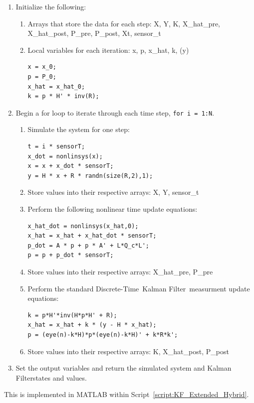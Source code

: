 \documentclass[]{article}
\renewcommand{\lstlistingname}{Script}
\newcommand{\scriptname}{\lstlistingname}
\newcommand{\KF}{Kalman Filter}
\newcommand{\DT}{Discrete-Time}
\newcommand{\DTKF}{\DT \ \KF}
\begin{document}
		\begin{enumerate}
			\item Initialize the following:
			\begin{enumerate}
				\item Arrays that store the data for each step: X, Y, K, X\_hat\_pre, X\_hat\_post, P\_pre, P\_post, Xt, sensor\_t\\
				\item Local variables for each iteration: x, p, x\_hat, k, (y)
\begin{lstlisting}
x = x_0;
p = P_0;
x_hat = x_hat_0;
k = p * H' * inv(R);
\end{lstlisting}
			\end{enumerate}
			\item Begin a for loop to iterate through each time step, \lstinline{for i = 1:N}.
			\begin{enumerate}
				\item Simulate the system for one step:
\begin{lstlisting}
t = i * sensorT;
x_dot = nonlinsys(x);
x = x + x_dot * sensorT;
y = H * x + R * randn(size(R,2),1);
\end{lstlisting}
				\item Store values into their respective arrays: X, Y, sensor\_t
				\item Perform the following nonlinear time update equations:\label{step:nonlin_time_update}
\begin{lstlisting}
x_hat_dot = nonlinsys(x_hat,0);
x_hat = x_hat + x_hat_dot * sensorT;
p_dot = A * p + p * A' + L*Q_c*L';
p = p + p_dot * sensorT;
\end{lstlisting}
				\item Store values into their respective arrays: X\_hat\_pre, P\_pre
				\item Perform the standard \DTKF \ measurment update equations:
\begin{lstlisting}
k = p*H'*inv(H*p*H' + R);
x_hat = x_hat + k * (y - H * x_hat);
p = (eye(n)-k*H)*p*(eye(n)-k*H)' + k*R*k';
\end{lstlisting}
				\item Store values into their respective arrays: K, X\_hat\_post, P\_post
			\end{enumerate}
			\item Set the output variables and return the simulated system and \KF states and values.
		\end{enumerate}
		This is implemented in MATLAB within \scriptname \ \ref{script:KF_Extended_Hybrid}.
	
\end{document}

